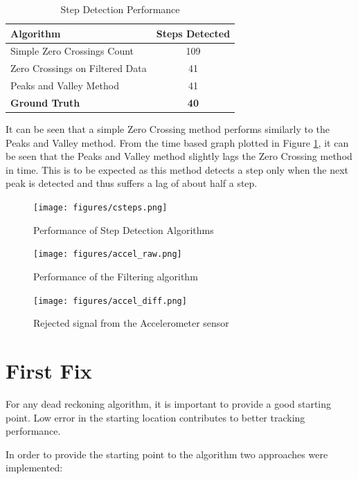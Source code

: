 \begin{table}[tbph]
\centering
\begin{tabular}{||l|c||}
\hline
\hline
\textbf{Algorithm} & \textbf{Steps Detected} \\
\hline

Simple Zero Crossings Count & 109 \\
Zero Crossings on Filtered Data & 41 \\
Peaks and Valley Method & 41 \\
\textbf{Ground Truth} & \textbf{40} \\
\hline
\hline
\end{tabular}
\caption{Step Detection Performance\label{tbl:step_table}}
\end{table}

It can be seen that a simple Zero Crossing method performs similarly to the 
Peaks and Valley method. From the time based graph plotted in 
Figure \ref{fig:csteps}, it can be seen that the Peaks and Valley method 
slightly lags the Zero Crossing method in time. This is to be expected as this
method detects a step only when the next peak is detected and thus suffers a 
lag of about half a step.

\begin{figure}[tbph]
    \centering
    \texttt{[image: figures/csteps.png]}
    \caption{Performance of Step Detection Algorithms\label{fig:csteps}}
\end{figure}

\begin{figure}[tbph]
    \centering
    \texttt{[image: figures/accel\_raw.png]}
    \caption{Performance of the Filtering algorithm \label{fig:accel_raw}}
\end{figure}

\begin{figure}[tbph]
    \centering
    \texttt{[image: figures/accel\_diff.png]}
    \caption{Rejected signal from the Accelerometer sensor \label{fig:accel_diff}}
\end{figure}


\section{First Fix}

For any dead reckoning algorithm, it is important to provide a good starting
point. Low error in the starting location contributes to better
tracking performance.

In order to provide the starting point to the algorithm two approaches were
implemented:

